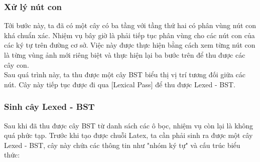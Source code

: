 \documentclass[a4paper,12pt]{article}
\begin{document}

	
	\subsubsection*{Xử lý nút con}
	
	Tới bước này, ta đã có một cây có ba tầng với tầng thứ hai có phân vùng nút con khá chuẩn xác. Nhiệm vụ bây giờ là phải tiếp tục phân vùng cho các nút con của các ký tự trên đường cơ sở. Việc này được thực hiện bằng cách xem từng nút con là từng vùng ảnh mới riêng biệt và thực hiện lại ba bước trên để thu được các cây con. \\
	
	Sau quá trình này, ta thu được một cây BST biểu thị vị trí tương đối giữa các nút. Cây này tiếp tục được đi qua [Lexical Pass] để thu được Lexed - BST\cite{zanibbi}.
	
	\subsubsection{Sinh cây Lexed - BST\cite{zanibbi}}
	
	Sau khi đã thu được cây BST từ danh sách các ô bọc, nhiệm vụ còn lại là không quá phức tạp. Trước khi tạo được chuỗi Latex, ta cần phải sinh ra được một cây Lexed - BST\cite{zanibbi}, cây này chứa các thông tin như "nhóm ký tự" và cấu trúc biểu thức:
	
\end{document}
